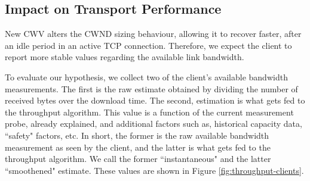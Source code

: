 \documentclass[10pt,sigconf,anonymous]{acmart}
\begin{document}

\subsection{Impact on Transport Performance} 
\label{sec:transport-impact}

New CWV alters the CWND sizing behaviour, allowing it to recover faster, after an idle period in an active TCP connection. Therefore, we expect the client to report more stable values regarding the available link bandwidth. 

To evaluate our hypothesis, we collect two of the client's available bandwidth measurements. The first is the raw estimate obtained by dividing the number of received bytes over the download time. The second, estimation is what gets fed to the throughput algorithm. This value is a function of the current measurement probe, already explained, and additional factors such as, historical capacity data, ``safety" factors, etc. In short, the former is the raw available bandwidth measurement as seen by the client, and the latter is what gets fed to the throughput algorithm. We call the former ``instantaneous" and the latter ``smoothened" estimate. These values are shown in Figure \ref{fig:throughput-clients}.
\end{document}
